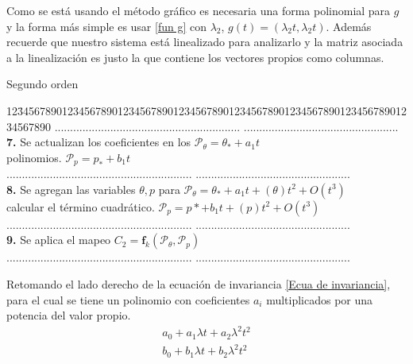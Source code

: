 Como se está usando el método gráfico es necesaria una forma polinomial para $g$ y la forma más simple es usar \ref{fun g} con $\lambda_{2}$, $g(t)=(\lambda_{2}t,\lambda_{2}t)$. Además recuerde que nuestro sistema está linealizado para analizarlo y la matriz asociada a la linealización es justo la que contiene los vectores propios como columnas.\\

\begin{center}
Segundo orden
\begin{tabbing}
12\=34567890123456789012345678901234567890123456\=7890123456789012345678901234567890\kill%
\>............................................................  \>..................................................\\
\>\textbf{7.} Se actualizan los coeficientes en los \> $\mathcal{P}_{\theta}=\theta_{*}+a_{1}t$\\
\>polinomios.\> $\mathcal{P}_{p}=p_{*}+b_{1}t$\\
\>............................................................  \>..................................................\\
\>\textbf{8.} Se agregan las variables $\theta,p$ para \> $\mathcal{P}_{\theta}=\theta_{*}+a_{1}t+(\theta)t^{2}+O(t^{3})$ \\
\>calcular el término cuadrático. \> $\mathcal{P}_{p}=p{*}+b_{1}t+(p)t^{2}+O(t^{3})$\\
\>............................................................  \>..................................................\\
\>\textbf{9.} Se aplica el mapeo\> $C_{2}=\mathbf{f}_{k}(\mathcal{P}_{\theta},\mathcal{P}_{p})$\\
\>............................................................  \>..................................................\\
\end{tabbing}
\end{center}
Retomando el lado derecho de la ecuación de invariancia \eqref{Ecua de invariancia}, para el cual se tiene un polinomio con coeficientes $a_{i}$ multiplicados por una potencia del valor propio.
\begin{eqnarray}
a_{0}+a_{1}\lambda t+a_{2}\lambda^{2}t^{2}\\
b_{0}+b_{1}\lambda t+b_{2}\lambda^{2}t^{2}
\end{eqnarray}
